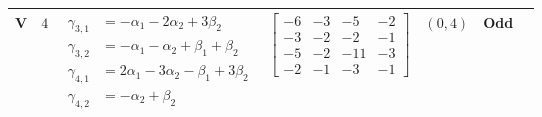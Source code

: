 \begin{center}
\begin{tabular}{|c|c|c|c|c|c|c|}
		\hline
		V & $4$ & \parbox{4.25cm}{\begin{align*}
			\gamma_{3,1} &= -\alpha_1 - 2\alpha_2 + 3\beta_2\\
			\gamma_{3,2} &= -\alpha_1 - \alpha_2 + \beta_1 + \beta_2\\
			\gamma_{4,1} &= 2\alpha_1 - 3\alpha_2 - \beta_1 + 3\beta_2\\
			\gamma_{4,2} &= -\alpha_2 + \beta_2
		\end{align*}} & $\begin{bmatrix} -6 & -3 & -5 & -2\\-3 & -2 & -2 & -1\\-5 & -2 & -11 & -3\\-2 & -1 & -3 & -1 \end{bmatrix}$ & $(0,4)$ & Odd\\ %
		\hline
	\end{tabular}
\end{center}
